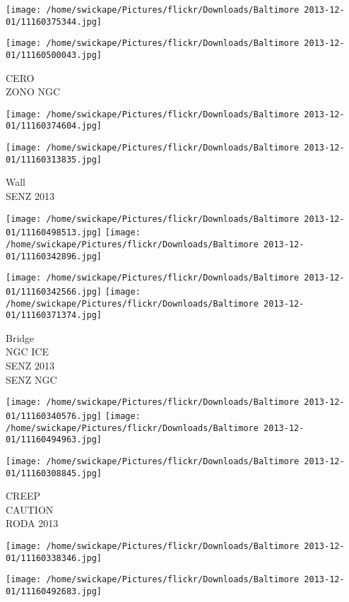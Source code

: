 \documentclass[10pt,letterpaper]{article}
\begin{document}
\texttt{[image: /home/swickape/Pictures/flickr/Downloads/Baltimore 2013-12-01/11160375344.jpg]}

\vspace{0.25in}
\texttt{[image: /home/swickape/Pictures/flickr/Downloads/Baltimore 2013-12-01/11160500043.jpg]}

CERO\\
ZONO NGC
\pagebreak

\texttt{[image: /home/swickape/Pictures/flickr/Downloads/Baltimore 2013-12-01/11160374604.jpg]}

\vspace{0.25in}
\texttt{[image: /home/swickape/Pictures/flickr/Downloads/Baltimore 2013-12-01/11160313835.jpg]}

Wall\\
SENZ 2013
\pagebreak

\texttt{[image: /home/swickape/Pictures/flickr/Downloads/Baltimore 2013-12-01/11160498513.jpg]}
\texttt{[image: /home/swickape/Pictures/flickr/Downloads/Baltimore 2013-12-01/11160342896.jpg]}

\texttt{[image: /home/swickape/Pictures/flickr/Downloads/Baltimore 2013-12-01/11160342566.jpg]}
\texttt{[image: /home/swickape/Pictures/flickr/Downloads/Baltimore 2013-12-01/11160371374.jpg]}

Bridge\\
NGC ICE\\
SENZ 2013\\
SENZ NGC
\pagebreak

\texttt{[image: /home/swickape/Pictures/flickr/Downloads/Baltimore 2013-12-01/11160340576.jpg]}
\texttt{[image: /home/swickape/Pictures/flickr/Downloads/Baltimore 2013-12-01/11160494963.jpg]}

\texttt{[image: /home/swickape/Pictures/flickr/Downloads/Baltimore 2013-12-01/11160308845.jpg]}

CREEP\\
CAUTION\\
RODA 2013
\pagebreak

\texttt{[image: /home/swickape/Pictures/flickr/Downloads/Baltimore 2013-12-01/11160338346.jpg]}

\vspace{0.25in}
\texttt{[image: /home/swickape/Pictures/flickr/Downloads/Baltimore 2013-12-01/11160492683.jpg]}
\end{document}

